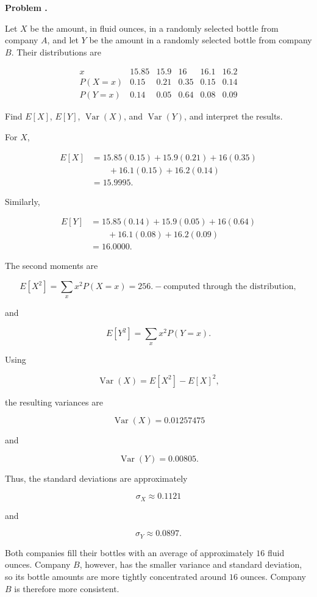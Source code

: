 \documentclass[11pt]{article}
\newcounter{problem}
\newenvironment{problem}[1][]{
    \refstepcounter{problem}
    \begin{problemheader}
        \textbf{Problem \theproblem%
        \if\relax\detokenize{#1}\relax
        \else. #1%
        \fi}
    \end{problemheader}
}{
    \vspace{0.5em}
}
\newenvironment{solution}{
    \par
    \begin{tcolorbox}[
        colback=white,
        colframe=uwgold,
        boxrule=0.7pt,
        arc=2mm,
        left=3mm,
        right=3mm,
        top=2mm,
        bottom=2mm,
        breakable,
        before skip=0.5em,
        after skip=1em,
        title=\textbf{Solution},
        coltitle=uwpurple,
        fonttitle=\bfseries
    ]
}{
    \end{tcolorbox}
}
\begin{document}
   \newpage \begin{problem}

Let \(X\) be the amount, in fluid ounces, in a randomly selected bottle
from company \(A\), and let \(Y\) be the amount in a randomly selected
bottle from company \(B\). Their distributions are

\[
\begin{array}{c|ccccc}
x&15.85&15.9&16&16.1&16.2\\ \hline
P(X=x)&0.15&0.21&0.35&0.15&0.14\\
P(Y=x)&0.14&0.05&0.64&0.08&0.09
\end{array}
\]

Find \(E[X]\), \(E[Y]\), \(\operatorname{Var}(X)\), and
\(\operatorname{Var}(Y)\), and interpret the results.
\end{problem}
\begin{solution}

For \(X\),

\begin{align*}
E[X]
&=
15.85(0.15)+15.9(0.21)+16(0.35)\\
&\qquad
+16.1(0.15)+16.2(0.14)\\
&=
 {15.9995}.
\end{align*}

Similarly,

\begin{align*}
E[Y]
&=
15.85(0.14)+15.9(0.05)+16(0.64)\\
&\qquad
+16.1(0.08)+16.2(0.09)\\
&=
 {16.0000}.
\end{align*}

The second moments are

\[
E[X^2]
=
\sum_xx^2P(X=x)
=
256. - \text{computed through the distribution},
\]

and

\[
E[Y^2]
=
\sum_xx^2P(Y=x).
\]

Using

\[
\operatorname{Var}(X)=E[X^2]-E[X]^2,
\]

the resulting variances are

\[
 {
\operatorname{Var}(X)=0.01257475
}
\]

and

\[
 {
\operatorname{Var}(Y)=0.00805.
}
\]

Thus, the standard deviations are approximately

\[
\sigma_X\approx0.1121
\]

and

\[
\sigma_Y\approx0.0897.
\]

Both companies fill their bottles with an average of approximately
\(16\) fluid ounces. Company \(B\), however, has the smaller variance and
standard deviation, so its bottle amounts are more tightly concentrated
around \(16\) ounces. Company \(B\) is therefore more consistent.

\end{solution}
 
\end{document}
